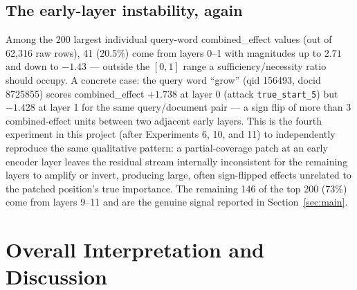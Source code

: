\documentclass[11pt]{article}
\begin{document}
\subsection{The early-layer instability, again}
\label{sec:instability}

Among the 200 largest individual query-word combined\_effect values (out of 62{,}316 raw
rows), 41 (20.5\%) come from layers 0--1 with magnitudes up to $\mathbf{2.71}$ and down to
$\mathbf{-1.43}$ — outside the $[0,1]$ range a sufficiency/necessity ratio should occupy.
A concrete case: the query word ``grow'' (qid 156493, docid 8725855) scores
combined\_effect $+1.738$ at layer 0 (attack \texttt{true\_start\_5}) but $-1.428$ at
layer 1 for the same query/document pair — a sign flip of more than 3 combined-effect
units between two adjacent early layers. This is the fourth experiment in this project
(after Experiments 6, 10, and 11) to independently reproduce the same qualitative pattern:
a partial-coverage patch at an early encoder layer leaves the residual stream internally
inconsistent for the remaining layers to amplify or invert, producing large, often
sign-flipped effects unrelated to the patched position's true importance. The remaining
146 of the top 200 (73\%) come from layers 9--11 and are the genuine signal reported in
Section~\ref{sec:main}.

\section{Overall Interpretation and Discussion}
\end{document}
